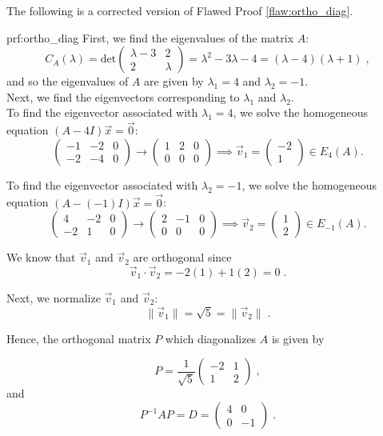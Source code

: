 The following is a corrected version of Flawed Proof \ref{flaw:ortho_diag}. %

\begin{prf}{prf:ortho_diag} %
First, we find the eigenvalues of the matrix $A$:
$$C_A(\lambda) = \text{det}\begin{pmatrix} \lambda -3 & 2 \\
2 & \lambda \end{pmatrix} = \lambda^2 - 3\lambda -4 = (\lambda - 4)(\lambda +1)\;,$$
and so the eigenvalues of $A$ are given by $\lambda_1 = 4$ and $\lambda_2 = -1.$ \\

Next, we find the eigenvectors corresponding to $\lambda_1$ and $\lambda_2.$\\

To find the eigenvector associated with $\lambda_1 = 4$, we solve the homogeneous equation $(A - 4I)\vec{x} = \vec{0}$:
$$\left(\begin{array}{cc|c}
-1 &-2 &0 \\
-2 &-4 &0
\end{array}\right) \rightarrow \left(\begin{array}{cc|c}
1 &2 &0 \\
0 &0 &0
\end{array}\right) \implies \vec{v}_1 = \begin{pmatrix} -2\\
1 \end{pmatrix} \in E_4(A).$$

To find the eigenvector associated with $\lambda_2 = -1$, we solve the homogeneous equation $(A - (-1)I)\vec{x} = \vec{0}$:
$$\left(\begin{array}{cc|c}
4 &-2 &0 \\
-2 &1 &0
\end{array}\right) \rightarrow \left(\begin{array}{cc|c}
2 &-1 &0 \\
0 &0 &0
\end{array}\right) \implies \vec{v}_2 = \begin{pmatrix} 1\\
2 \end{pmatrix} \in E_{-1}(A).$$

We know that $\vec{v}_1$ and $\vec{v}_2$ are orthogonal since
$$\vec{v}_1 \cdot \vec{v}_2 = -2(1) + 1(2) = 0\;.$$

Next, we normalize $\vec{v}_1$ and $\vec{v}_2$:
$$\lVert \vec{v}_1 \rVert = \sqrt{5} = \lVert \vec{v}_2 \rVert\;.$$

Hence, the orthogonal matrix $P$ which diagonalizes $A$ is given by

$$P = \frac{1}{\sqrt{5}} \begin{pmatrix} -2 &1 \\ 1 &2 \end{pmatrix}\;,$$
and
$$P^{-1}AP = D = \begin{pmatrix} 4 &0 \\ 0 &-1 \end{pmatrix}\;.$$
\end{prf}
